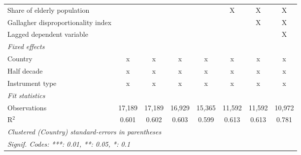 \begin{tabular}{lccccccc}
   Share of elderly population                                       &                &                &                &               & X              & X              & X\\  
   Gallagher disproportionality index                                &                &                &                &               &                & X              & X\\  
   Lagged dependent variable                                         &                &                &                &               &                &                & X\\  
   \emph{Fixed effects}\\
   Country                                                           & x              & x              & x              & x             & x              & x              & x\\  
   Half decade                                                       & x              & x              & x              & x             & x              & x              & x\\  
   Instrument type                                                   & x              & x              & x              & x             & x              & x              & x\\  
   \midrule \emph{Fit statistics}\\
   Observations                                                      & 17,189         & 17,189         & 16,929         & 15,365        & 11,592         & 11,592         & 10,972\\  
   R$^2$                                                             & 0.601          & 0.602          & 0.603          & 0.599         & 0.613          & 0.613          & 0.781\\  
   \midrule
   \multicolumn{8}{l}{\emph{Clustered (Country) standard-errors in parentheses}}\\
   \multicolumn{8}{l}{\emph{Signif. Codes: ***: 0.01, **: 0.05, *: 0.1}}\\
\end{tabular}
\par\endgroup


